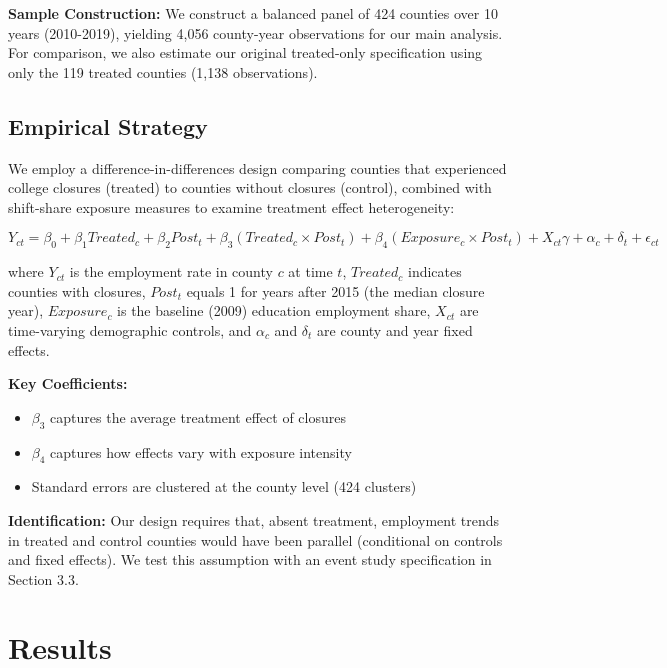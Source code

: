 \documentclass[12pt]{article}
\begin{document}
\textbf{Sample Construction:} We construct a balanced panel of 424 counties over 10 years (2010-2019), yielding 4,056 county-year observations for our main analysis. For comparison, we also estimate our original treated-only specification using only the 119 treated counties (1,138 observations).

\subsection{Empirical Strategy}

We employ a difference-in-differences design comparing counties that experienced college closures (treated) to counties without closures (control), combined with shift-share exposure measures to examine treatment effect heterogeneity:

\begin{equation}
Y_{ct} = \beta_0 + \beta_1 Treated_c + \beta_2 Post_t + \beta_3 (Treated_c \times Post_t) + \beta_4 (Exposure_c \times Post_t) + X_{ct}\gamma + \alpha_c + \delta_t + \epsilon_{ct}
\end{equation}

where $Y_{ct}$ is the employment rate in county $c$ at time $t$, $Treated_c$ indicates counties with closures, $Post_t$ equals 1 for years after 2015 (the median closure year), $Exposure_c$ is the baseline (2009) education employment share, $X_{ct}$ are time-varying demographic controls, and $\alpha_c$ and $\delta_t$ are county and year fixed effects.

\textbf{Key Coefficients:}
\begin{itemize}
\item $\beta_3$ captures the average treatment effect of closures
\item $\beta_4$ captures how effects vary with exposure intensity
\item Standard errors are clustered at the county level (424 clusters)
\end{itemize}

\textbf{Identification:} Our design requires that, absent treatment, employment trends in treated and control counties would have been parallel (conditional on controls and fixed effects). We test this assumption with an event study specification in Section 3.3.

\clearpage

\section{Results}
\end{document}
